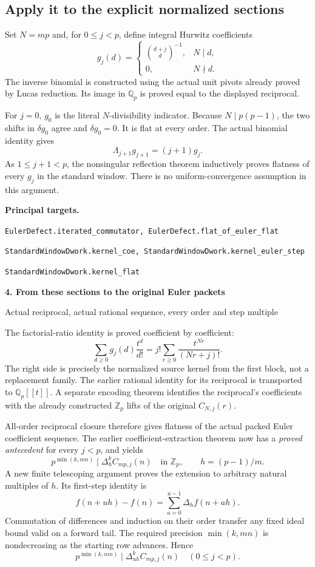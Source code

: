\documentclass[11pt]{article}
\newcommand{\Z}{\mathbb Z}\newcommand{\N}{\mathbb N}\newcommand{\Q}{\mathbb Q}
\newcommand{\target}[1]{{\footnotesize\texttt{#1}}}
\newcommand{\pageheading}[2]{{\Large\bfseries\color{ink}#1}\par{\small #2}\par\medskip}
\begin{document}
\subsection*{Apply it to the explicit normalized sections}
Set $N=mp$ and, for $0\le j<p$, define integral Hurwitz coefficients
\[
 g_j(d)=
 \begin{cases}
 \displaystyle\binom{d+j}{d}^{-1},&N\mid d,\\[1mm]
 0,&N\nmid d.
 \end{cases}
\]
The inverse binomial is constructed using the actual unit pivots already proved by Lucas reduction. Its image in $\Q_p$ is proved equal to the displayed reciprocal.

For $j=0$, $g_0$ is the literal $N$-divisibility indicator. Because $N\mid p(p-1)$, the two shifts in $\delta g_0$ agree and $\delta g_0=0$. It is flat at every order. The actual binomial identity gives
\[
 \Lambda_{j+1}g_{j+1}=(j+1)g_j.
\]
As $1\le j+1<p$, the nonsingular reflection theorem inductively proves flatness of every $g_j$ in the standard window. There is no uniform-convergence assumption in this argument.

\textbf{Principal targets.}\par
\target{EulerDefect.iterated\_commutator, EulerDefect.flat\_of\_euler\_flat}\par
\target{StandardWindowDwork.kernel\_coe, StandardWindowDwork.kernel\_euler\_step}\par
\target{StandardWindowDwork.kernel\_flat}

\newpage
\pageheading{4. From these sections to the original Euler packets}{Actual reciprocal, actual rational sequence, every order and step multiple}
The factorial-ratio identity is proved coefficient by coefficient:
\[
 \sum_{d\ge0}g_j(d)\frac{t^d}{d!}
 =j!\sum_{r\ge0}\frac{t^{Nr}}{(Nr+j)!}.
\]
The right side is precisely the normalized source kernel from the first block, not a replacement family. The earlier rational identity for its reciprocal is transported to $\Q_p[[t]]$. A separate encoding theorem identifies the reciprocal's coefficients with the already constructed $\Z_p$ lifts of the original $C_{N,j}(r)$.

All-order reciprocal closure therefore gives flatness of the actual packed Euler coefficient sequence. The earlier coefficient-extraction theorem now has a \emph{proved antecedent} for every $j<p$, and yields
\[
 p^{\min(k,mn)}\mid\Delta_h^k C_{mp,j}(n)\quad\text{in }\Z_p,
 \qquad h=(p-1)/m.
\]
A new finite telescoping argument proves the extension to arbitrary natural multiples of $h$. Its first-step identity is
\[
 f(n+uh)-f(n)=\sum_{a=0}^{u-1}\Delta_h f(n+ah).
\]
Commutation of differences and induction on their order transfer any fixed ideal bound valid on a forward tail. The required precision $\min(k,mn)$ is nondecreasing as the starting row advances. Hence
\[
 \boxed{p^{\min(k,mn)}\mid\Delta_{uh}^{k}C_{mp,j}(n)\quad(0\le j<p).}
\]
\end{document}

